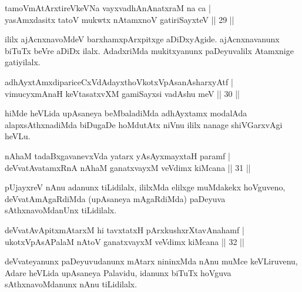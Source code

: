 \begin{shl}
tamoVmAtArxtireVkeVNa vayxvadhAnAnatxraM na ca |\\
yasAmxdasitx tatoV mukwtx nA\s \s tamxnoV gatiriSayxteV \hfill || 29 || 
\end{shl}

\begin{artha}
ililx ajAcnxnavoMdeV barxhamxpArxpitxge aDiDxyAgide. ajAcnxnavanunx biTuTx beVre aDiDx ilalx. AdadxriMda mukitxyanunx paDeyuvalilx Atamxnige gatiyilalx.
\end{artha}


\begin{shl}
adhAyxtAmxdipariceCxVdAdayxthoVkotxVpAsanAsharxyAtf |\\
vimucyxmAnaH keVtasatxvXM gamiSayxsi vadA\s \s shu meV \hfill || 30 || 
\end{shl}

\begin{artha}
hiMde heVLida upAsaneya beMbaladiMda adhAyxtamx modalAda alapxsAthxnadiMda biDugaDe hoMdutAtx niVnu ililx nanage shiVGarxvAgi heVLu.
\end{artha}


\begin{shl}
nAhaM tadaBxgavanevxVda yatarx yAsAyxmayxtaH paramf |\\
deVvatAvatamxRnA nAhaM ganatxvayxM veVdimx kiMcana \hfill || 31 || 
\end{shl}

\begin{artha}
pUjayxreV nAnu adanunx tiLidilalx, ililxMda elilxge muMdakekx hoVguveno, deVvatAmAgaRdiMda (upAsaneya mAgaRdiMda) paDeyuva sAthxnavoMdanUnx tiLidilalx.
\end{artha}

\begin{shl}
deVvatAvApitxmAtarxM hi tavxtatxH pArxkushxrXtavAnahamf |\\
ukotxVpAsAPalaM nAtoV ganatxvayxM veVdimx kiMcana \hfill || 32 || 
\end{shl}

\begin{artha}
deVvateyanunx paDeyuvudanunx mAtarx nininxMda nAnu muMce keVLiruvenu, Adare heVLida upAsaneya Palavidu, idanunx biTuTx hoVguva sAthxnavoMdanunx nAnu tiLidilalx.
\end{artha}



